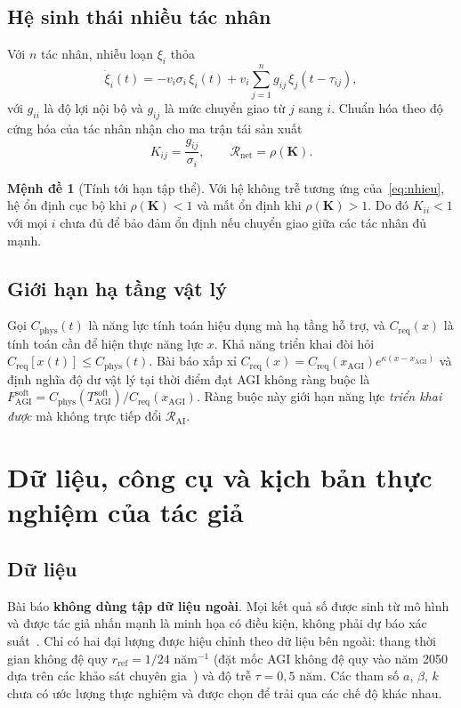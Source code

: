 \documentclass[12pt,a4paper,openany]{report}
\numberwithin{equation}{chapter}   %
\theoremstyle{definition}
\newtheorem{menhde}{Mệnh đề}[chapter]
\newcommand{\RAI}{\mathcal{R}_{\mathrm{AI}}}
\newcommand{\Rnet}{\mathcal{R}_{\mathrm{net}}}
\begin{document}
\subsection{Hệ sinh thái nhiều tác nhân}
Với $n$ tác nhân, nhiễu loạn $\xi_i$ thỏa
\begin{equation}
  \dot{\xi}_i(t) = -v_i\sigma_i\,\xi_i(t) + v_i\sum_{j=1}^{n} g_{ij}\,\xi_j(t-\tau_{ij}),
  \label{eq:nhieu}
\end{equation}
với $g_{ii}$ là độ lợi nội bộ và $g_{ij}$ là mức chuyển giao từ $j$ sang $i$. Chuẩn hóa theo độ cứng hóa của tác nhân nhận cho ma trận tái sản xuất
\begin{equation}
  K_{ij}=\frac{g_{ij}}{\sigma_i},\qquad \Rnet=\rho(\mathbf{K}).
  \label{eq:K}
\end{equation}
\begin{menhde}[Tính tới hạn tập thể]\label{mh:3}
Với hệ không trễ tương ứng của~\eqref{eq:nhieu}, hệ ổn định cục bộ khi $\rho(\mathbf{K})<1$ và mất ổn định khi $\rho(\mathbf{K})>1$. Do đó $K_{ii}<1$ với mọi $i$ chưa đủ để bảo đảm ổn định nếu chuyển giao giữa các tác nhân đủ mạnh.
\end{menhde}

\subsection{Giới hạn hạ tầng vật lý}
Gọi $C_{\mathrm{phys}}(t)$ là năng lực tính toán hiệu dụng mà hạ tầng hỗ trợ, và $C_{\mathrm{req}}(x)$ là tính toán cần để hiện thực năng lực $x$. Khả năng triển khai đòi hỏi $C_{\mathrm{req}}[x(t)]\le C_{\mathrm{phys}}(t)$. Bài báo xấp xỉ $C_{\mathrm{req}}(x)=C_{\mathrm{req}}(x_{\mathrm{AGI}})e^{\kappa(x-x_{\mathrm{AGI}})}$ và định nghĩa độ dư vật lý tại thời điểm đạt AGI không ràng buộc là $F^{\mathrm{soft}}_{\mathrm{AGI}}=C_{\mathrm{phys}}(T^{\mathrm{soft}}_{\mathrm{AGI}})/C_{\mathrm{req}}(x_{\mathrm{AGI}})$. Ràng buộc này giới hạn năng lực \emph{triển khai được} mà không trực tiếp đổi $\RAI$.

\section{Dữ liệu, công cụ và kịch bản thực nghiệm của tác giả}\label{sec:kichban_tg}
\subsection{Dữ liệu}
Bài báo \textbf{không dùng tập dữ liệu ngoài}. Mọi kết quả số được sinh từ mô hình và được tác giả nhấn mạnh là minh họa có điều kiện, không phải dự báo xác suất~\cite{burtsev2026}. Chỉ có hai đại lượng được hiệu chỉnh theo dữ liệu bên ngoài: thang thời gian không đệ quy $r_{\mathrm{ref}}=1/24$ năm$^{-1}$ (đặt mốc AGI không đệ quy vào năm 2050 dựa trên các khảo sát chuyên gia~\cite{grace2025}) và độ trễ $\tau=0{,}5$ năm. Các tham số $a$, $\beta$, $k$ chưa có ước lượng thực nghiệm và được chọn để trải qua các chế độ khác nhau.
\end{document}
